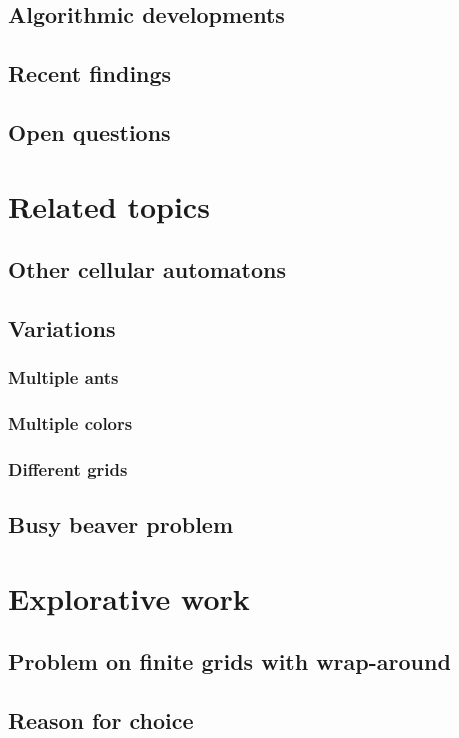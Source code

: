 \documentclass{article}
\begin{document}
\subsection{Algorithmic developments}
\subsection{Recent findings}
\subsection{Open questions}

\section{Related topics}
\subsection{Other cellular automatons}
\subsection{Variations}
\subsubsection{Multiple ants}
\subsubsection{Multiple colors}
\subsubsection{Different grids}
\subsection{Busy beaver problem}

\newpage

\section{Explorative work}
\subsection{Problem on finite grids with wrap-around}
\subsection{Reason for choice}
\end{document}
